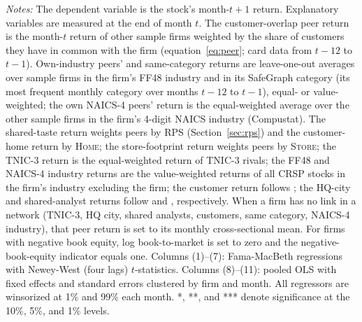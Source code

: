 \begin{table}
\par\vspace{4pt}\begin{minipage}{\linewidth}\scriptsize \emph{Notes:} The dependent variable is the stock's month-$t+1$ return. Explanatory variables are measured at the end of month $t$. The customer-overlap peer return is the month-$t$ return of other sample firms weighted by the share of customers they have in common with the firm (equation~\eqref{eq:peer}; card data from $t-12$ to $t-1$). Own-industry peers' and same-category returns are leave-one-out averages over sample firms in the firm's FF48 industry and in its SafeGraph category (its most frequent monthly category over months $t-12$ to $t-1$), equal- or value-weighted; the own NAICS-4 peers' return is the equal-weighted average over the other sample firms in the firm's 4-digit NAICS industry (Compustat). The shared-taste return weights peers by RPS (Section~\ref{sec:rps}) and the customer-home return by \textsc{Home}; the store-footprint return weights peers by \textsc{Store}; the TNIC-3 return is the equal-weighted return of TNIC-3 rivals; the FF48 and NAICS-4 industry returns are the value-weighted returns of all CRSP stocks in the firm's industry excluding the firm; the customer return follows \citet{CohenFrazzini2008}; the HQ-city and shared-analyst returns follow \citet{ParsonsSabbatucciTitman2020} and \citet{AliHirshleifer2020}, respectively. When a firm has no link in a network (TNIC-3, HQ city, shared analysts, customers, same category, NAICS-4 industry), that peer return is set to its monthly cross-sectional mean. For firms with negative book equity, log book-to-market is set to zero and the negative-book-equity indicator equals one. Columns (1)--(7): Fama-MacBeth regressions with Newey-West (four lags) $t$-statistics. Columns (8)--(11): pooled OLS with fixed effects and standard errors clustered by firm and month. All regressors are winsorized at 1\% and 99\% each month. *, **, and *** denote significance at the 10\%, 5\%, and 1\% levels.\end{minipage}
\end{table}